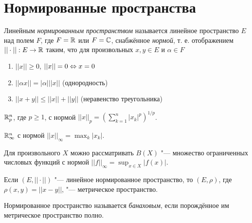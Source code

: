 \documentclass[main]{subfiles}
\begin{document}
\section{Нормированные пространства}
\begin{definition}
  Линейным \emph{нормированным пространством} называется
  линейное пространство \( E \) над полем \( F \),
  где \( F = \mathbb{R} \) или \( F = \mathbb{C} \),
  снабжённое \emph{нормой}, т. е. отображением \( ||\cdot|| : E \to \mathbb{R} \)
  таким, что для произвольных \( x, y \in E \) и \( \alpha \in F \)
  \begin{enumerate}
    \item \( ||x|| \ge 0 \), \( ||x|| = 0 \Leftrightarrow x = 0 \)
    \item \( ||\alpha x|| = |\alpha| ||x|| \) (однородность)
    \item \( ||x + y|| \le ||x|| + ||y|| \) (неравенство треугольника)
  \end{enumerate}
\end{definition}

\begin{example}
  \( \mathbb{R}^n_{p} \), где \( p \ge 1 \), с нормой
  \( ||x||_p = {\left(\sum_{k=1}^n |x_k|^p \right)}^{1/p} \).
\end{example}
\begin{example}
  \( \mathbb{R}^n_\infty \) с нормой \( ||x||_\infty = \max_{k} |x_k| \).
\end{example}
\begin{example}
  Для произвольного \( X \) можно рассматривать
  \( B(X) \) "--- множество ограниченных числовых функций
  с нормой \( ||f||_\infty = \sup_{x \in X} |f(x)| \).
\end{example}


\begin{remark}
  Если \( (E, ||\cdot||) \) "--- линейное нормированное пространство,
  то \( (E, \rho) \), где \( \rho(x, y) = ||x - y|| \), "---
  метрическое пространство.
\end{remark}

\begin{definition}
  Нормированное пространство называется \emph{банаховым},
  если порождённое им метрическое пространство
  полно.
\end{definition}
\end{document}
